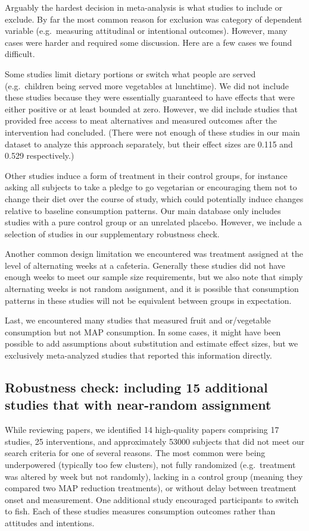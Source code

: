 \documentclass[sn-nature,referee,pdflatex]{sn-jnl}
\begin{document}
Arguably the hardest decision in meta-analysis is what studies to
include or exclude. By far the most common reason for exclusion was
category of dependent variable (e.g.~measuring attitudinal or
intentional outcomes). However, many cases were harder and required some
discussion. Here are a few cases we found difficult.

Some studies limit dietary portions or switch what people are served
(e.g.~children being served more vegetables at lunchtime). We did not
include these studies because they were essentially guaranteed to have
effects that were either positive or at least bounded at zero. However,
we did include studies that provided free access to meat alternatives
\citep{acharya2004, bianchi2022} and measured outcomes after the
intervention had concluded. (There were not enough of these studies in
our main dataset to analyze this approach separately, but their effect
sizes are 0.115 and 0.529 respectively.)

Other studies induce a form of treatment in their control groups, for
instance asking all subjects to take a pledge to go vegetarian or
encouraging them not to change their diet over the course of study,
which could potentially induce changes relative to baseline consumption
patterns. Our main database only includes studies with a pure control
group or an unrelated placebo. However, we include a selection of
studies in our supplementary robustness check.

Another common design limitation we encountered was treatment assigned
at the level of alternating weeks at a cafeteria. Generally these
studies did not have enough weeks to meet our sample size requirements,
but we also note that simply alternating weeks is not random assignment,
and it is possible that consumption patterns in these studies will not
be equivalent between groups in expectation.

Last, we encountered many studies that measured fruit and or/vegetable
consumption but not MAP consumption. In some cases, it might have been
possible to add assumptions about substitution and estimate effect
sizes, but we exclusively meta-analyzed studies that reported this
information directly.

\subsection{Robustness check: including 15 additional studies that with
near-random assignment}\label{sec5.4.3}

While reviewing papers, we identified 14 high-quality papers comprising
17 studies, 25 interventions, and approximately 53000 subjects that did
not meet our search criteria for one of several reasons. The most common
were being underpowered (typically too few clusters), not fully
randomized (e.g.~treatment was altered by week but not randomly),
lacking in a control group (meaning they compared two MAP reduction
treatments), or without delay between treatment onset and measurement.
One additional study encouraged participants to switch to fish. Each of
these studies measures consumption outcomes rather than attitudes and
intentions.
\end{document}
